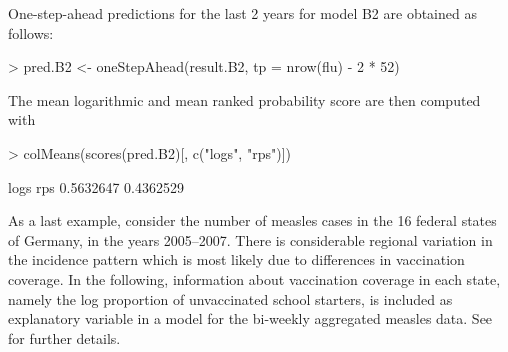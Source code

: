 \documentclass[a4paper,11pt]{article}
\begin{document}
One-step-ahead predictions for the last 2 years for model B2 are obtained as 
follows:
\begin{Schunk}
\begin{Sinput}
> pred.B2 <- oneStepAhead(result.B2, tp = nrow(flu) - 2 * 52)
\end{Sinput}
\end{Schunk}
The mean logarithmic and mean ranked probability score are then computed with
\begin{Schunk}
\begin{Sinput}
> colMeans(scores(pred.B2)[, c("logs", "rps")])
\end{Sinput}
\begin{Soutput}
     logs       rps 
0.5632647 0.4362529 
\end{Soutput}
\end{Schunk}


As a last example, consider the number of measles cases in the 16 federal states
of Germany, in the years 2005--2007. There is considerable regional variation 
in the incidence pattern which is most likely due to differences in vaccination 
coverage. In the following, information about vaccination coverage in each 
state, namely the log proportion of unvaccinated school starters, is included 
as explanatory variable in a model for the bi-weekly aggregated measles data. 
See \cite{herzog-etal-2010} for further details.
 
\end{document}
